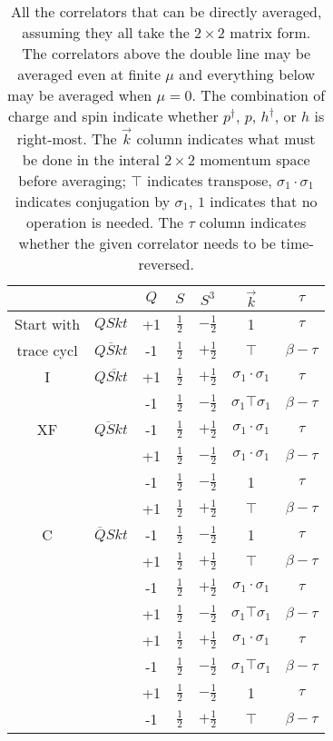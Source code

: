 \begin{table}[h]
  \centering
  \begin{tabular}{cc|ccccc}
             & & $Q$ & $S$ & $S^3$ & $\vec{k}$ & $\tau$  \\
  \hline
  Start with & $QSkt$ & +1 & $\frac{1}{2}$ & $-\frac{1}{2}$ & 1 & $\tau$ \\
  \hline
  trace cycl & $\overline{QSkt}$ & -1 & $\frac{1}{2}$ & $+\frac{1}{2}$ & $\top$ & $\beta-\tau$ \\
  \hline
  I          & $Q\overline{Sk}t$ & +1 & $\frac{1}{2}$ & $+\frac{1}{2}$ & $\sigma_1\cdot\sigma_1$ & $\tau$ \\
             & & -1 & $\frac{1}{2}$ & $-\frac{1}{2}$ & $\sigma_1\top\sigma_1$ & $\beta-\tau$ \\
  \hline\hline
  XF         & $\overline{QSk}t$ & -1 & $\frac{1}{2}$ & $+\frac{1}{2}$ & $\sigma_1\cdot\sigma_1$ & $\tau$ \\
             & & +1 & $\frac{1}{2}$ & $-\frac{1}{2}$ & $\sigma_1\cdot\sigma_1$ & $\beta-\tau$ \\
             & & -1 & $\frac{1}{2}$ & $-\frac{1}{2}$ & 1 & $\tau$ \\
             & & +1 & $\frac{1}{2}$ & $+\frac{1}{2}$ & $\top$ & $\beta-\tau$ \\
  \hline
  C          & $\overline{Q}Skt$ & -1 & $\frac{1}{2}$ & $-\frac{1}{2}$ & 1 & $\tau$ \\
             & & +1 & $\frac{1}{2}$ & $+\frac{1}{2}$ & $\top$ & $\beta-\tau$ \\
             & & -1 & $\frac{1}{2}$ & $+\frac{1}{2}$ & $\sigma_1\cdot\sigma_1$ & $\tau$ \\
             & & +1 & $\frac{1}{2}$ & $-\frac{1}{2}$ & $\sigma_1\top\sigma_1$ & $\beta-\tau$ \\
             & & +1 & $\frac{1}{2}$ & $+\frac{1}{2}$ & $\sigma_1\cdot\sigma_1$ & $\tau$ \\
             & & -1 & $\frac{1}{2}$ & $-\frac{1}{2}$ & $\sigma_1\top\sigma_1$ & $\beta-\tau$ \\
             & & +1 & $\frac{1}{2}$ & $-\frac{1}{2}$ & 1 & $\tau$ \\
             & & -1 & $\frac{1}{2}$ & $+\frac{1}{2}$ & $\top$ & $\beta-\tau$
  \end{tabular}
  \caption{All the correlators that can be directly averaged, assuming they all take the $2 \times 2$ matrix form. The correlators above the double line may be averaged even at finite $\mu$ and everything below may be averaged when $\mu = 0$. The combination of charge and spin indicate whether $p^\dagger$, $p$, $h^\dagger$, or $h$ is right-most. The $\vec{k}$ column indicates what must be done in the interal $2 \times 2$ momentum space before averaging; $\top$ indicates transpose, $\sigma_1\cdot\sigma_1$ indicates conjugation by $\sigma_1$, $1$ indicates that no operation is needed. The $\tau$ column indicates whether the given correlator needs to be time-reversed.}
  \label{tab:1psym}
\end{table}

